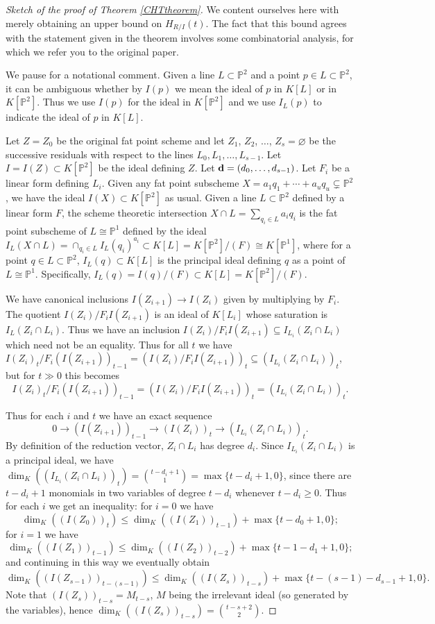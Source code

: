 \documentclass[11pt,twoside]{amsart}
\numberwithin{equation}{section}
\theoremstyle{definition}
\begin{document}
\begin{proof}[Sketch of the proof of Theorem \ref{CHTtheorem}]
We content ourselves here with merely obtaining an upper bound
on $H_{R/I}(t)$. The fact that this bound agrees with the statement given in the theorem
involves some combinatorial analysis, for which we refer you to the original paper.

We pause for a notational comment.
Given a line $L\subset{\mathbb{P}^{2}}$ and a point $p\in L\subset {\mathbb{P}^{2}}$, it can be ambiguous whether
by $I(p)$ we mean the ideal of $p$ in ${K}[L]$ or in ${K}[{\mathbb{P}^{2}}]$.
Thus we use $I(p)$ for the ideal in ${K}[{\mathbb{P}^{2}}]$ and we use 
$I_L(p)$ to indicate the ideal of $p$ in ${K}[L]$.

Let $Z=Z_0$ be the original fat point scheme and let $Z_1$, $Z_2$, $\ldots$, $Z_s=\varnothing$
be the successive residuals with respect to the lines $L_0,L_1,\ldots, L_{s-1}$.
Let $I=I(Z)\subset{K}[{\mathbb{P}^{2}}]$ be the ideal defining $Z$.
Let ${\bf d}=(d_0,\ldots,d_{s-1})$. Let $F_i$ be a linear form defining $L_i$.
Given any fat point subscheme $X=a_1q_1+\cdots+a_uq_u\subsetneq{\mathbb{P}^{2}}$,
we have the ideal $I(X)\subset{K}[{\mathbb{P}^{2}}]$ as usual.
Given a line $L\subset {\mathbb{P}^{2}}$ defined by a linear form $F$, the scheme theoretic intersection
$X\cap L=\sum_{q_i\in L}a_iq_i$ is the fat point subscheme of $L\cong{\mathbb{P}^{1}}$
defined by the ideal 
$I_L(X\cap L)=\cap_{q_i\in L}I_L(q_i)^{a_i}\subset{K}[L]={K}[{\mathbb{P}^{2}}]/(F)\cong{K}[{\mathbb{P}^{1}}]$, 
where for a point $q\in L\subset{\mathbb{P}^{2}}$,
$I_L(q)\subset{K}[L]$ is the principal ideal defining $q$ as a point
of $L\cong{\mathbb{P}^{1}}$. Specifically, $I_L(q)=I(q)/(F)\subset{K}[L]={K}[{\mathbb{P}^{2}}]/(F)$.

We have canonical inclusions $I(Z_{i+1})\to I(Z_i)$ given by multiplying by $F_i$.
The quotient $I(Z_i)/F_iI(Z_{i+1})$ is an ideal of ${K}[L_i]$ whose saturation
is $I_L(Z_i\cap L_i)$. Thus we have an inclusion $I(Z_i)/F_iI(Z_{i+1})\subseteq I_{L_i}(Z_i\cap L_i)$
which need not be an equality. Thus for all $t$ we have
$I(Z_i)_t/F_i(I(Z_{i+1}))_{t-1}=(I(Z_i)/F_iI(Z_{i+1}))_t\subseteq (I_{L_i}(Z_i\cap L_i))_t$,
but for $t\gg0$ this becomes
$$I(Z_i)_t/F_i(I(Z_{i+1}))_{t-1}=(I(Z_i)/F_iI(Z_{i+1}))_t=(I_{L_i}(Z_i\cap L_i))_t.$$

Thus for each $i$ and $t$ we have an exact sequence
$$0\to (I(Z_{i+1}))_{t-1}\to (I(Z_i))_t\to (I_{L_i}(Z_i\cap L_i))_t.$$
By definition of the reduction vector, $Z_i\cap L_i$ has degree $d_i$.
Since $I_{L_i}(Z_i\cap L_i)$ is a principal ideal, we have
$\dim_{K}((I_{L_i}(Z_i\cap L_i))_t)=\binom{t-d_i+1}{1}=\max\{t-d_i+1,0\}$,
since there are $t-d_i+1$ monomials in two variables of degree $t-d_i$
whenever $t-d_i\geq 0$. Thus for each $i$ we get an inequality:
for $i=0$ we have
$$\dim_{K}((I(Z_0))_t)\leq\dim_{K}((I(Z_1))_{t-1})+\max\{t-d_0+1,0\};$$
for $i=1$ we have
$$\dim_{K}((I(Z_1))_{t-1})\leq\dim_{K}((I(Z_2))_{t-2})+\max\{t-1-d_1+1,0\};$$
and continuing in this way we eventually obtain
$$\dim_{K}((I(Z_{s-1}))_{t-(s-1)})\leq\dim_{K}((I(Z_s))_{t-s})+\max\{t-(s-1)-d_{s-1}+1,0\}.$$
Note that 
$(I(Z_s))_{t-s}=M_{t-s}$, $M$ being the irrelevant ideal (so generated by the variables),
hence $\dim_{K}((I(Z_s))_{t-s})=\binom{t-s+2}{2}$. 


\end{proof}
\end{document}
